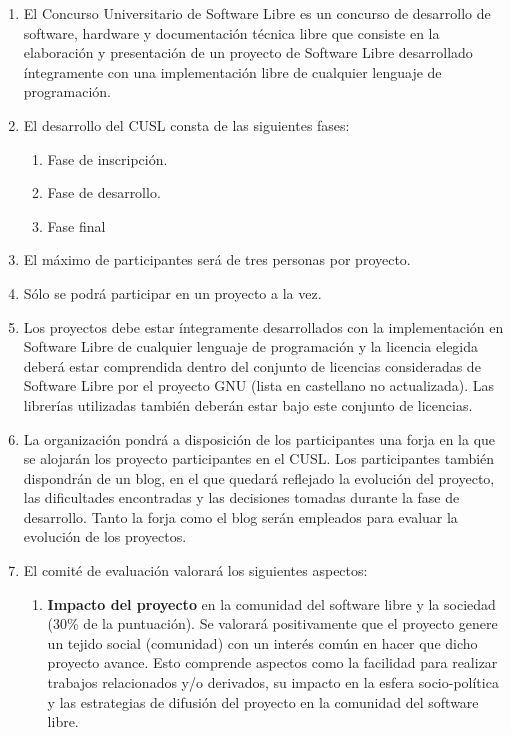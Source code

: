 \begin{enumerate}
\item El Concurso Universitario de Software Libre es un concurso de desarrollo
de software, hardware y documentación técnica libre que consiste en la
elaboración y presentación de un proyecto de Software Libre desarrollado
íntegramente con una implementación libre de cualquier lenguaje de programación.

\item El desarrollo del CUSL consta de las siguientes fases:
\begin{enumerate}
\item Fase de inscripción.
\item Fase de desarrollo.
\item Fase final
\end{enumerate}

\item El máximo de participantes será de tres personas por proyecto.

\item Sólo se podrá participar en un proyecto a la vez.


\item Los proyectos debe estar íntegramente desarrollados con la implementación
en Software Libre de cualquier lenguaje de programación y la licencia elegida
deberá estar comprendida dentro del conjunto de licencias consideradas de
Software Libre por el proyecto GNU (lista en castellano no actualizada). Las
librerías utilizadas también deberán estar bajo este conjunto de licencias.

\item La organización pondrá a disposición de los participantes una forja en la
que se alojarán los proyecto participantes en el CUSL. Los participantes también
dispondrán de un blog, en el que quedará reflejado la evolución del proyecto,
las dificultades encontradas y las decisiones tomadas durante la fase de
desarrollo. Tanto la forja como el blog serán empleados para evaluar la
evolución de los proyectos.

\item El comité de evaluación valorará los siguientes aspectos:
\begin{enumerate}

\item {\bf Impacto del proyecto} en la comunidad del software libre y la
sociedad (30\% de la puntuación). Se valorará positivamente que el proyecto
genere un tejido social (comunidad) con un interés común en hacer que dicho
proyecto avance. Esto comprende aspectos como la facilidad para realizar
trabajos relacionados y/o derivados, su impacto en la esfera socio-política y
las estrategias de difusión del proyecto en la comunidad del software libre.


\end{enumerate}
\end{enumerate}
